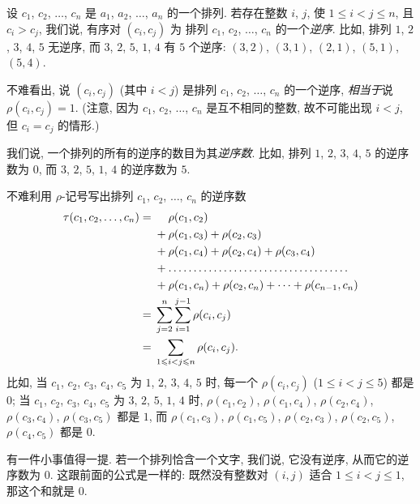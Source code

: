 设
\(c_1\), \(c_2\), \(\dots\), \(c_n\)
是 \(a_1\), \(a_2\), \(\dots\), \(a_n\) 的一个排列.
若存在整数 \(i\), \(j\),
使 \(1 \leq i < j \leq n\),
且 \(c_i > c_j\),
我们说, 有序对 \((c_i, c_j)\) 为%
排列 \(c_1\), \(c_2\), \(\dots\), \(c_n\)
的一个\emph{逆序}.
比如, 排列 \(1\), \(2\), \(3\), \(4\), \(5\) 无逆序,
而 \(3\), \(2\), \(5\), \(1\), \(4\) 有 \(5\) 个逆序:
\((3, 2)\), \((3, 1)\), \((2, 1)\), \((5, 1)\), \((5, 4)\).

不难看出,
说 \((c_i, c_j)\) (其中 \(i < j\))
是排列
\(c_1\), \(c_2\), \(\dots\), \(c_n\)
的一个逆序,
\emph{相当于}说 \(\rho(c_i, c_j) = 1\).
(注意, 因为
\(c_1\), \(c_2\), \(\dots\), \(c_n\)
是互不相同的整数,
故不可能出现
\(i < j\),
但 \(c_i = c_j\) 的情形.)

我们说, 一个排列的所有的逆序的数目为其\emph{逆序数}.
比如, 排列 \(1\), \(2\), \(3\), \(4\), \(5\) 的逆序数为 \(0\),
而 \(3\), \(2\), \(5\), \(1\), \(4\) 的逆序数为 \(5\).

不难利用 \(\rho\)-记号写出排列
\(c_1\), \(c_2\), \(\dots\), \(c_n\)
的逆序数
\begin{align*}
    \tau(c_1, c_2, \dots, c_n)
    = {} & \hphantom{{} + {}} \rho(c_1, c_2)
    \\
         & + \rho(c_1, c_3) + \rho(c_2, c_3)
    \\
         & + \rho(c_1, c_4) + \rho(c_2, c_4)
    + \rho(c_3, c_4)
    \\
         & +
    \dots \dots \dots \dots
    \dots \dots \dots \dots
    \dots \dots \dots \dots
    \\
         & + \rho(c_1, c_n) + \rho(c_2, c_n) + \dots
    + \rho(c_{n-1}, c_n)
    \\
    = {} & \sum_{j = 2}^{n} {
    \sum_{i = 1}^{j - 1} {\rho(c_i, c_j)} }
    \\
    = {} & \sum_{1 \leq i < j \leq n} {\rho(c_i, c_j)}.
\end{align*}
比如,
当 \(c_1\), \(c_2\), \(c_3\), \(c_4\), \(c_5\) 为
\(1\), \(2\), \(3\), \(4\), \(5\) 时,
每一个 \(\rho(c_i, c_j)\)
(\(1 \leq i < j \leq 5\))
都是 \(0\);
当 \(c_1\), \(c_2\), \(c_3\), \(c_4\), \(c_5\) 为
\(3\), \(2\), \(5\), \(1\), \(4\) 时,
\(\rho(c_1, c_2)\), \(\rho(c_1, c_4)\),
\(\rho(c_2, c_4)\),
\(\rho(c_3, c_4)\), \(\rho(c_3, c_5)\)
都是 \(1\),
而
\(\rho(c_1, c_3)\), \(\rho(c_1, c_5)\),
\(\rho(c_2, c_3)\), \(\rho(c_2, c_5)\),
\(\rho(c_4, c_5)\)
都是 \(0\).

有一件小事值得一提.
若一个排列恰含一个文字, 我们说, 它没有逆序,
从而它的逆序数为 \(0\).
这跟前面的公式是一样的:
既然没有整数对 \((i, j)\) 适合 \(1 \leq i < j \leq 1\),
那这个和就是 \(0\).


